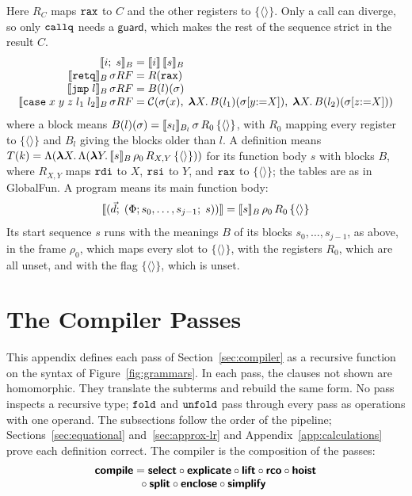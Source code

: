 Here $R_C$ maps $\mathtt{rax}$ to $C$ and the other registers to
$\{\langle\rangle\}$. Only a call can diverge, so only $\mathtt{callq}$
needs a $\mathsf{guard}$, which makes the rest of the sequence strict
in the result $C$.
{\small\figdefs
{}
\[
\begin{array}{@{}r@{\;}c@{\;}l@{}}
  \den{i;\; s}_B & = & \den{i}\,\den{s}_B\\
  \den{\kw{retq}}_B\,\sigma R F & = & R(\kw{rax})\\
  \den{\kw{jmp}\;l}_B\,\sigma R F & = & B(l)(\sigma)\\
  \den{\kw{case}\;x\;y\;z\;l_1\;l_2}_B\,\sigma R F & = &
    \mathcal{C}(\sigma(x),\;
      \mlam{X} B(l_1)(\sigma[y{:=}X]),\;
      \mlam{X} B(l_2)(\sigma[z{:=}X]))
\end{array}
\]
}
where a block means $B(l)(\sigma) = \llbracket s_l \rrbracket_{B_l}\,\sigma\,R_0\,
\{\langle\rangle\}$, with $R_0$ mapping every register to
$\{\langle\rangle\}$ and $B_l$ giving the blocks older than $l$. A
definition means
$T(k) = \Lambda(\boldsymbol{\lambda} X.\, \Lambda(\boldsymbol{\lambda} Y.\, \llbracket s \rrbracket_B\,\rho_0\,R_{X,Y}\,
\{\langle\rangle\}))$ for its function body $s$ with blocks $B$, where
$R_{X,Y}$ maps $\mathtt{rdi}$ to $X$, $\mathtt{rsi}$ to $Y$, and $\mathtt{rax}$ to
$\{\langle\rangle\}$; the tables are as in GlobalFun. A program means
its main function body:
\[
  \llbracket (\vec{d};\; (\Phi; s_0, \ldots, s_{j-1};\; s)) \rrbracket =
  \llbracket s \rrbracket_B\,\rho_0\,R_0\,\{\langle\rangle\}
\]
Its start sequence $s$ runs with the meanings $B$ of its blocks $s_0,
\ldots, s_{j-1}$, as above, in the frame $\rho_0$, which maps every
slot to $\{\langle\rangle\}$, with the registers $R_0$, which are all
unset, and with the flag $\{\langle\rangle\}$, which is unset.

\section{The Compiler Passes}
\label{app:passes}

This appendix defines each pass of Section~\ref{sec:compiler} as a
recursive function on the syntax of Figure~\ref{fig:grammars}. In each
pass, the clauses not shown are homomorphic. They translate the
subterms and rebuild the same form. No pass inspects a recursive type;
$\mathtt{fold}$ and $\mathtt{unfold}$ pass through every pass as operations
with one operand. The subsections follow the order of the pipeline; Sections~\ref{sec:equational} and~\ref{sec:approx-lr} and Appendix~\ref{app:calculations} prove each definition correct. The compiler is the composition of the passes:
\[
\begin{array}{@{}l@{}}
  \pass{compile} = \pass{select} \circ \pass{explicate} \circ \pass{lift}
    \circ \pass{rco} \circ \pass{hoist}\\
  \qquad\qquad {} \circ \pass{split} \circ \pass{enclose} \circ \pass{simplify}
\end{array}
\]

